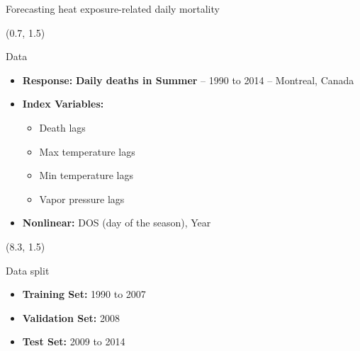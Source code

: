 \documentclass[
  12pt,
  ignorenonframetext,
  aspectratio=169,
]{beamer}
\begin{document}
\begin{frame}{Forecasting heat exposure-related daily mortality}
\label{forecasting-heat-exposure-related-daily-mortality-2}
\begin{textblock}{7}(0.7, 1.5)
\fontsize{11}{12}\sf
\begin{block}{Data}
  \begin{itemize}
    \item \color{violet} \textbf{Response:} \color{black} \textbf{Daily deaths in Summer} -- 1990 to 2014 -- Montreal, Canada
    \item \color{violet} \textbf{Index Variables:} 
      \begin{itemize}
        \item \color{black} Death lags
        \item \color{black} Max temperature lags
        \item \color{black} Min temperature lags
        \item \color{black} Vapor pressure lags
      \end{itemize}
    \item \color{violet}\textbf{Nonlinear:} \color{black} DOS (day of the season), Year \newline
  \end{itemize}
\end{block}
\end{textblock}

\begin{textblock}{7}(8.3, 1.5)
\fontsize{11}{12}\sf
\begin{block}{Data split}
  \begin{itemize}
  \item \color{violet}\textbf{Training Set:} \color{black}1990 to 2007 \newline
  \item \color{violet}\textbf{Validation Set:} \color{black}2008 \newline
  \item \color{violet}\textbf{Test Set:} \color{black}2009 to 2014 \newline \newline \newline \newline \newline \newline
\end{itemize}
\end{block}
\end{textblock}
\end{frame}
\end{document}
